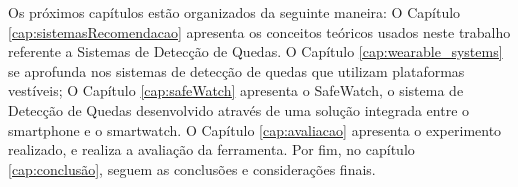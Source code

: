Os próximos capítulos estão organizados da seguinte maneira: O Capítulo \ref{cap:sistemasRecomendacao} apresenta os conceitos teóricos usados neste trabalho referente a Sistemas de Detecção de Quedas. O Capítulo \ref{cap:wearable_systems} se aprofunda nos sistemas de detecção de quedas que utilizam plataformas vestíveis; O Capítulo \ref{cap:safeWatch} apresenta o SafeWatch, o sistema de Detecção de Quedas desenvolvido através de uma solução integrada entre o smartphone e o smartwatch. O Capítulo \ref{cap:avaliacao} apresenta o experimento realizado, e realiza a avaliação da ferramenta. Por fim, no capítulo \ref{cap:conclusão}, seguem as conclusões e considerações finais. 

